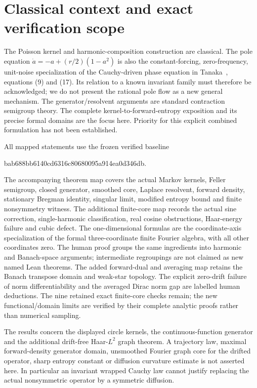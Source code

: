 \documentclass[11pt]{article}
\begin{document}
\section{Classical context and exact verification scope}
The Poisson kernel and harmonic-composition construction
are classical. The pole equation
$\dot a=-a+(r/2)(1-a^2)$ is also the constant-forcing,
zero-frequency, unit-noise specialization of the
Cauchy-driven phase equation in Tanaka~\cite{tanaka},
equations (9) and (17). Its relation to a known invariant
family must therefore be acknowledged; we do not present
the rational pole flow as a new general mechanism.
The generator/resolvent arguments are standard contraction
semigroup theory. The complete kernel-to-forward-entropy
exposition and its precise formal domains are the focus here.
Priority for this explicit combined formulation has not
been established.

All mapped statements use the frozen verified baseline
\begin{center}\small\ttfamily
bab688bb6140cd6316c80680095a914ea0d346db.
\end{center}
The accompanying theorem map covers the actual Markov
kernels, Feller semigroup, closed generator, smoothed
core, Laplace resolvent, forward density, stationary
Bregman identity, singular limit, modified entropy bound
and finite nonsymmetry witness. The additional finite-core map records
the actual sine correction, single-harmonic classification, real
cosine obstructions, Haar-energy failure and cubic defect. The
one-dimensional formulas are the coordinate-axis specialization of
the formal three-coordinate finite Fourier algebra, with all other
coordinates zero. The human proof groups
the same ingredients into harmonic and Banach-space
arguments; intermediate regroupings are not claimed as
new named Lean theorems. The added forward-dual and averaging map
retains the Banach transpose domain and weak-star topology. The explicit
zero-drift failure of norm differentiability and the averaged Dirac norm
gap are labelled human deductions. The nine retained exact finite-core
checks remain; the new functional/domain limits are verified by their
complete analytic proofs rather than numerical sampling.

The results concern the displayed circle kernels, the
continuous-function generator and the additional drift-free
Haar-$L^2$ graph theorem. A trajectory law, maximal forward-density
generator domain, unsmoothed Fourier graph core for the drifted
operator, sharp entropy constant or diffusion curvature estimate
is not asserted here.
In particular an invariant wrapped Cauchy law cannot
justify replacing the actual nonsymmetric operator by
a symmetric diffusion.
\end{document}
